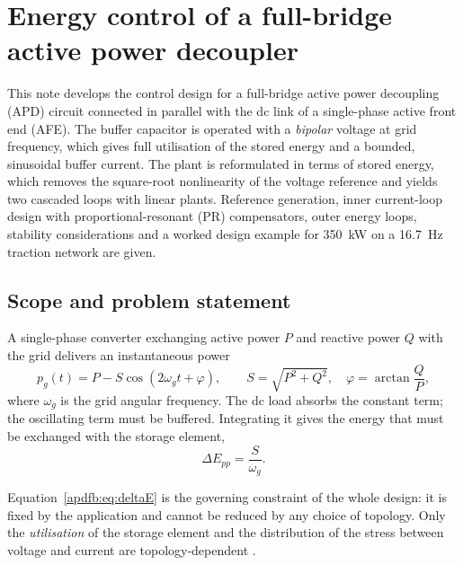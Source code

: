 \chapter{Energy control of a full-bridge active power decoupler}
\label{ch:apdfb}
\begin{chapabstract}
This note develops the control design for a full-bridge active power decoupling
(APD) circuit connected in parallel with the dc link of a single-phase active
front end (AFE). The buffer capacitor is operated with a \emph{bipolar} voltage
at grid frequency, which gives full utilisation of the stored energy and a
bounded, sinusoidal buffer current. The plant is reformulated in terms of stored
energy, which removes the square-root nonlinearity of the voltage reference and
yields two cascaded loops with linear plants. Reference generation, inner
current-loop design with proportional-resonant (PR) compensators, outer energy
loops, stability considerations and a worked design example for
\SI{350}{\kilo\watt} on a \SI{16.7}{\hertz} traction network are given.
\end{chapabstract}

\section{Scope and problem statement}

A single-phase converter exchanging active power $P$ and reactive power $Q$ with
the grid delivers an instantaneous power
\begin{equation}
p_g(t) = P - S\cos(2\omega_g t + \varphi),
\qquad S=\sqrt{P^2+Q^2},\quad \varphi=\arctan\frac{Q}{P},
\label{apdfb:eq:pg}
\end{equation}
where $\omega_g$ is the grid angular frequency. The dc load absorbs the constant
term; the oscillating term must be buffered. Integrating it gives the energy
that must be exchanged with the storage element,
\begin{equation}
\Delta E_{pp} = \frac{S}{\omega_g}.
\label{apdfb:eq:deltaE}
\end{equation}

Equation~\eqref{apdfb:eq:deltaE} is the governing constraint of the whole design: it
is fixed by the application and cannot be reduced by any choice of topology.
Only the \emph{utilisation} of the storage element and the distribution of the
stress between voltage and current are topology-dependent
\cite{sun2016review-apdfb,qin2016benchmark}.

